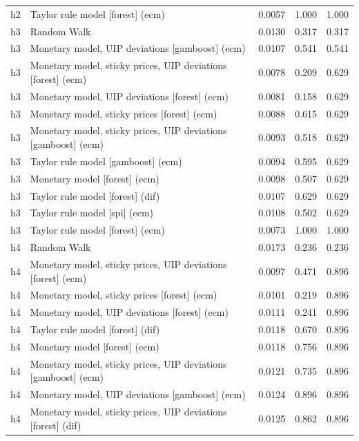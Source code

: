 \begin{ThreePartTable}
\begin{longtable}[t]{cp{5.5cm}ccc}
h2 & \raggedright Taylor rule model [forest] (ecm) & 0.0057 & 1.000 & 1.000\\
\addlinespace
h3 & \raggedright Random Walk & 0.0130 & 0.317 & 0.317\\
h3 & \raggedright Monetary model, UIP deviations [gamboost] (ecm) & 0.0107 & 0.541 & 0.541\\
h3 & \raggedright Monetary model, sticky prices, UIP deviations [forest] (ecm) & 0.0078 & 0.209 & 0.629\\
h3 & \raggedright Monetary model, UIP deviations [forest] (ecm) & 0.0081 & 0.158 & 0.629\\
h3 & \raggedright Monetary model, sticky prices [forest] (ecm) & 0.0088 & 0.615 & 0.629\\
h3 & \raggedright Monetary model, sticky prices, UIP deviations [gamboost] (ecm) & 0.0093 & 0.518 & 0.629\\
h3 & \raggedright Taylor rule model [gamboost] (ecm) & 0.0094 & 0.595 & 0.629\\
h3 & \raggedright Monetary model [forest] (ecm) & 0.0098 & 0.507 & 0.629\\
h3 & \raggedright Taylor rule model [forest] (dif) & 0.0107 & 0.629 & 0.629\\
h3 & \raggedright Taylor rule model [spi] (ecm) & 0.0108 & 0.502 & 0.629\\
h3 & \raggedright Taylor rule model [forest] (ecm) & 0.0073 & 1.000 & 1.000\\
\addlinespace
h4 & \raggedright Random Walk & 0.0173 & 0.236 & 0.236\\
h4 & \raggedright Monetary model, sticky prices, UIP deviations [forest] (ecm) & 0.0097 & 0.471 & 0.896\\
h4 & \raggedright Monetary model, sticky prices [forest] (ecm) & 0.0101 & 0.219 & 0.896\\
h4 & \raggedright Monetary model, UIP deviations [forest] (ecm) & 0.0111 & 0.241 & 0.896\\
h4 & \raggedright Taylor rule model [forest] (dif) & 0.0118 & 0.670 & 0.896\\
h4 & \raggedright Monetary model [forest] (ecm) & 0.0118 & 0.756 & 0.896\\
h4 & \raggedright Monetary model, sticky prices, UIP deviations [gamboost] (ecm) & 0.0121 & 0.735 & 0.896\\
h4 & \raggedright Monetary model, UIP deviations [gamboost] (ecm) & 0.0124 & 0.896 & 0.896\\
h4 & \raggedright Monetary model, sticky prices, UIP deviations [forest] (dif) & 0.0125 & 0.862 & 0.896\\

\end{longtable}
\end{ThreePartTable}
